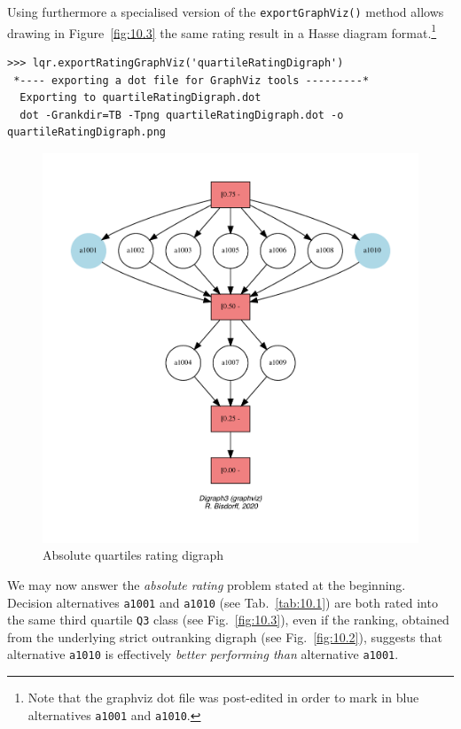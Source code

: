 Using furthermore a specialised version of the \texttt{exportGraphViz()} method allows drawing in Figure~\vref{fig:10.3} the same rating result in a Hasse diagram format.\footnote{Note that the graphviz dot file was post-edited in order to mark in blue alternatives \texttt{a1001} and \texttt{a1010}.}
\begin{lstlisting}
>>> lqr.exportRatingGraphViz('quartileRatingDigraph')
 *---- exporting a dot file for GraphViz tools ---------*
  Exporting to quartileRatingDigraph.dot
  dot -Grankdir=TB -Tpng quartileRatingDigraph.dot -o quartileRatingDigraph.png
\end{lstlisting}
\begin{figure}[ht]
\includegraphics[width=\hsize]{Figures/10-3-normedRatingDigraph.pdf}
\caption{Absolute quartiles rating digraph}
\label{fig:10.3}       %
\end{figure}

We may now answer the \emph{absolute rating} problem stated at the beginning. Decision alternatives \texttt{a1001} and \texttt{a1010} (see Tab.~\vref{tab:10.1}) are both rated into the same third quartile \texttt{Q3} class (see Fig.~\vref{fig:10.3}), even if the \Copeland ranking, obtained from the underlying strict outranking digraph (see Fig.~\vref{fig:10.2}), suggests that alternative \texttt{a1010} is effectively \emph{better performing than} alternative \texttt{a1001}. 

